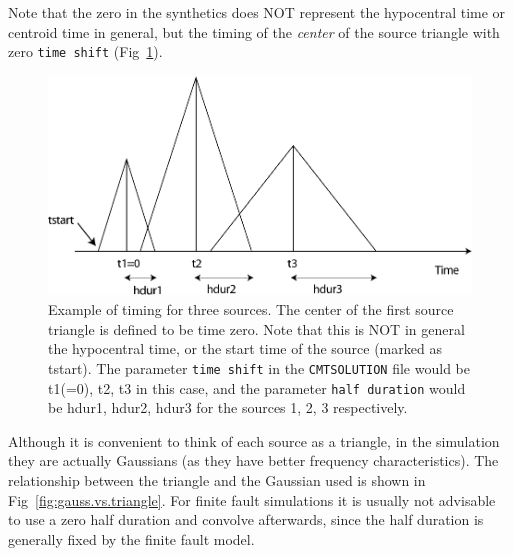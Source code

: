 Note that the zero in the synthetics does NOT represent the hypocentral
time or centroid time in general, but the timing of the \textit{center}
of the source triangle with zero \texttt{time shift} (Fig~\ref{fig:source_timing}).
%
\begin{figure}[htp]
\begin{centering}
\includegraphics[width=5in]{figures/source_timing.pdf}
\end{centering}
%
\caption{Example of timing for three sources. The center of the first source
triangle is defined to be time zero. Note that this is NOT in general
the hypocentral time, or the start time of the source (marked as tstart).
The parameter \texttt{time shift} in the \texttt{CMTSOLUTION} file
would be t1(=0), t2, t3 in this case, and the parameter \texttt{half duration}
would be hdur1, hdur2, hdur3 for the sources 1, 2, 3 respectively.}
\label{fig:source_timing}
\end{figure}


Although it is convenient to think of each source as a triangle, in
the simulation they are actually Gaussians (as they have better frequency
characteristics). The relationship between the triangle and the Gaussian
used is shown in Fig~\ref{fig:gauss.vs.triangle}. For finite fault
simulations it is usually not advisable to use a zero half duration
and convolve afterwards, since the half duration is generally fixed
by the finite fault model.\newline

\vspace{1cm}

